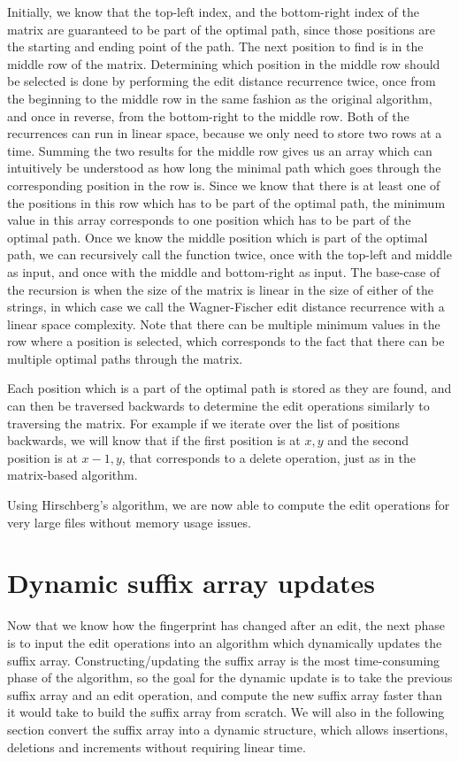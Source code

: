 Initially, we know that the top-left index, and the bottom-right index of the matrix are
guaranteed to be part of the optimal path, since those positions are the starting and
ending point of the path. The next position to find is in the middle row of the matrix.
Determining which position in the middle row should be selected is done by performing the
edit distance recurrence twice, once from the beginning to the middle row in the same
fashion as the original algorithm, and once in reverse, from the bottom-right to the
middle row. Both of the recurrences can run in linear space, because we only need to store
two rows at a time. Summing the two results for the middle row gives us an array which can
intuitively be understood as how long the minimal path which goes through the
corresponding position in the row is. Since we know that there is at least one of the
positions in this row which has to be part of the optimal path, the minimum value in this
array corresponds to one position which has to be part of the optimal path. Once we know
the middle position which is part of the optimal path, we can recursively call the
function twice, once with the top-left and middle as input, and once with the middle and
bottom-right as input. The base-case of the recursion is when the size of the matrix is
linear in the size of either of the strings, in which case we call the Wagner-Fischer edit
distance recurrence with a linear space complexity. Note that there can be multiple
minimum values in the row where a position is selected, which corresponds to the fact that
there can be multiple optimal paths through the matrix.

Each position which is a part of the optimal path is stored as they are found, and can
then be traversed backwards to determine the edit operations similarly to traversing the
matrix. For example if we iterate over the list of positions backwards, we will know that
if the first position is at $x, y$ and the second position is at $x - 1, y$, that
corresponds to a delete operation, just as in the matrix-based algorithm.

Using Hirschberg's algorithm, we are now able to compute the edit operations for very
large files without memory usage issues.


\section{Dynamic suffix array updates}

Now that we know how the fingerprint has changed after an edit, the next phase is to input
the edit operations into an algorithm which dynamically updates the suffix array.
Constructing/updating the suffix array is the most time-consuming phase of the algorithm,
so the goal for the dynamic update is to take the previous suffix array and an edit
operation, and compute the new suffix array faster than it would take to build the suffix
array from scratch. We will also in the following section convert the suffix array into a
dynamic structure, which allows insertions, deletions and increments without requiring
linear time.

